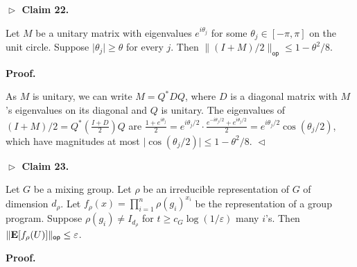 \documentclass[10pt,a4paper]{article}
\begin{document}


\par\medskip\noindent\textbf{
$\vartriangleright$ Claim 22. }\par



Let $M$ be a unitary matrix with eigenvalues $e^{i\theta_{j}}$ for some $\theta_{j}\in[-\pi,\pi]$ on the unit circle.
Suppose $\lvert\theta_{j}\rvert\geq\theta$ for every $j$. Then $\lVert(I+M)/2\rVert_{\mathsf{op}}\leq 1-\theta^{2}/8$.\par






\par\medskip\noindent\textbf{
\textbf{Proof}.}\par




As $M$ is unitary, we can write $M=Q^{\ast}DQ$, where $D$ is a diagonal matrix with $M$’s eigenvalues on its diagonal and $Q$ is unitary.
The eigenvalues of $(I+M)/2=Q^{\ast}(\frac{I+D}{2})Q$ are $\frac{1+e^{i\theta_{j}}}{2}=e^{i\theta_{j}/2}\cdot\frac{e^{-i\theta_{j}/2}+e^{i\theta_{j}/2}}{2}=e^{i\theta_{j}/2}\cos(\theta_{j}/2)$, which have magnitudes at most $\lvert\cos(\theta_{j}/2)\rvert\leq 1-\theta^{2}/8$.
$\vartriangleleft$\par





\par\medskip\noindent\textbf{
$\vartriangleright$ Claim 23. }\par



Let $G$ be a mixing group.
Let $\rho$ be an irreducible representation of $G$ of dimension $d_{\rho}$.
Let $f_{\rho}(x)=\prod_{i=1}^{n}\rho(g_{i})^{x_{i}}$ be the representation of a group program.
Suppose $\rho(g_{i})\neq I_{d_{\rho}}$ for $t\geq c_{G}\log(1/\varepsilon)$ many $i$’s.
Then $\lVert\mathop{\bf E\/}[f_{\rho}(U)]\rVert_{\mathsf{op}}\leq\varepsilon$.\par







\par\medskip\noindent\textbf{
\textbf{Proof}.}\par
\end{document}
